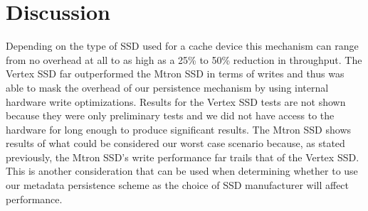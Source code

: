 \section{Discussion}
\label{sec:discussion}

Depending on the type of SSD used for a cache device this mechanism
can range from no overhead at all to as high as a 25\% to 50\%
reduction in throughput. The Vertex SSD far outperformed the Mtron SSD
in terms of writes and thus was able to mask the overhead of our
persistence mechanism by using internal hardware write
optimizations. Results for the Vertex SSD tests are not shown because
they were only preliminary tests and we did not have access to the
hardware for long enough to produce significant results. The Mtron SSD
shows results of what could be considered our worst case scenario
because, as stated previously, the Mtron SSD's write performance far
trails that of the Vertex SSD. This is another consideration that can
be used when determining whether to use our metadata persistence
scheme as the choice of SSD manufacturer will affect performance.
